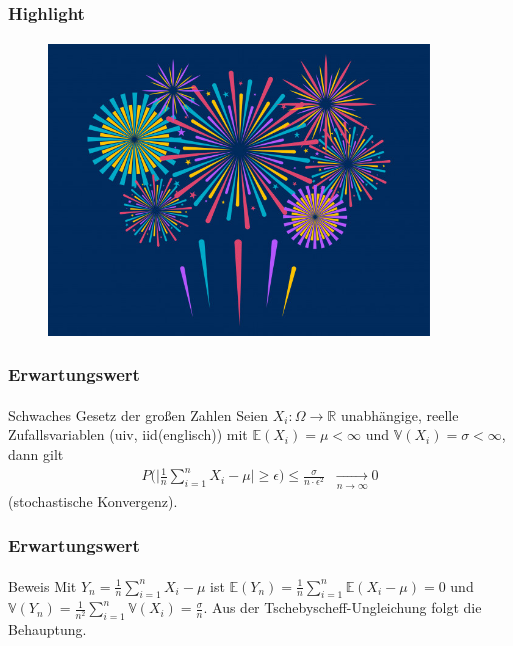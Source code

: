 \documentclass{beamer}
\begin{document}
\begin{frame}
    \frametitle{Highlight}
\framesubtitle{}
\begin{figure}[htp]
      \centering
    \includegraphics[width=0.9\textwidth]{img/firework}
\end{figure}
 \end{frame}


\begin{frame}
    \frametitle{Erwartungswert}
\framesubtitle{}
\begin{block}{Schwaches Gesetz der großen Zahlen}
Seien $X_i : \Omega \to \mathbb{R}$ unabhängige, reelle Zufallsvariablen (uiv, iid(englisch)) mit $\mathbb{E}(X_i) = \mu < \infty$ und $\mathbb{V}(X_i) = \sigma < \infty$, dann gilt
\begin{align*}
P \bigl ( \bigl | \frac{1}{n} \sum_{i=1}^{n} X_i - \mu \bigr |  \geq \epsilon \bigr ) \leq \frac{\sigma}{ n \cdot \epsilon^2} \; \; \underset{n \to \infty}{\longrightarrow} 0
\end{align*}
(stochastische Konvergenz). 
\end{block}
 \end{frame}


\begin{frame}
    \frametitle{Erwartungswert}
\framesubtitle{}
\begin{block}{Beweis}
Mit $Y_n =  \frac{1}{n} \sum_{i=1}^{n}  X_i - \mu$ ist $\mathbb{E}(Y_n) =  \frac{1}{n} \sum_{i=1}^{n} \mathbb{E}( X_i - \mu) = 0$ und 
$\mathbb{V}(Y_n) =  \frac{1}{n^2} \sum_{i=1}^{n} \mathbb{V}( X_i ) = \frac{\sigma}{n}$. Aus der Tschebyscheff-Ungleichung folgt die Behauptung.
\end{block}
 \end{frame}
\end{document}
